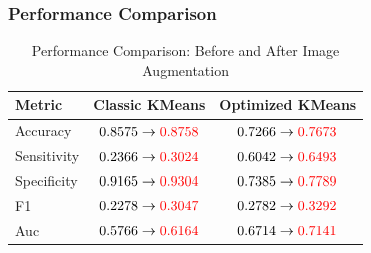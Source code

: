 \documentclass[12pt,letterpaper]{article}
\begin{document}
\subsubsection{Performance Comparison}
\begin{table}[H]
    \centering
    \caption{Performance Comparison: Before and After Image Augmentation}
    \begin{tabular}{lcc}
    \hline
    \textbf{Metric} & \textbf{Classic KMeans} & \textbf{Optimized KMeans} \\
    \hline
    Accuracy & $0.8575 \rightarrow \textcolor{red}{0.8758}$ & $0.7266 \rightarrow \textcolor{red}{0.7673}$ \\
    Sensitivity & $0.2366 \rightarrow \textcolor{red}{0.3024}$ & $0.6042 \rightarrow \textcolor{red}{0.6493}$ \\
    Specificity & $0.9165 \rightarrow \textcolor{red}{0.9304}$ & $0.7385 \rightarrow \textcolor{red}{0.7789}$ \\
    F1 & $0.2278 \rightarrow \textcolor{red}{0.3047}$ & $0.2782 \rightarrow \textcolor{red}{0.3292}$ \\
    Auc & $0.5766 \rightarrow \textcolor{red}{0.6164}$ & $0.6714 \rightarrow \textcolor{red}{0.7141}$ \\
    \hline
    \end{tabular}
\end{table}
\end{document}
